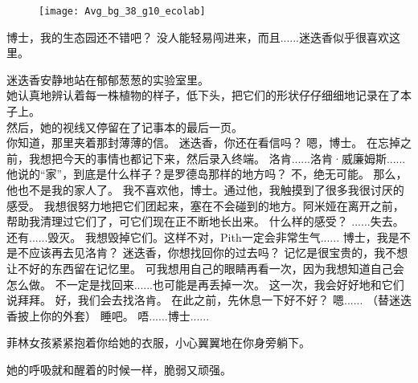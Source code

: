 \documentclass[openany]{book}
\begin{document}
\begin{figure}[h]
    \centering
    \texttt{[image: Avg\_bg\_38\_g10\_ecolab]}
\end{figure}
\begin{dialogue}
     博士，我的生态园还不错吧？
     没人能轻易闯进来，而且......迷迭香似乎很喜欢这里。\par
    迷迭香安静地站在郁郁葱葱的实验室里。\\
    她认真地辨认着每一株植物的样子，低下头，把它们的形状仔仔细细地记录在了本子上。\\
    然后，她的视线又停留在了记事本的最后一页。\\
    你知道，那里夹着那封薄薄的信。
     迷迭香，你还在看信吗？
     嗯，博士。
     在忘掉之前，我想把今天的事情也都记下来，然后录入终端。
     洛肯......洛肯·威廉姆斯......
     他说的“家”，到底是什么样子？是罗德岛那样的地方吗？
     不，绝无可能。
     那么，他也不是我的家人了。
     我不喜欢他，博士。通过他，我触摸到了很多我很讨厌的感受。
     我想很努力地把它们团起来，塞在不会碰到的地方。阿米娅在离开之前，帮助我清理过它们了，可它们现在正不断地长出来。
     什么样的感受？
     ......失去。
     还有......毁灭。
     我想毁掉它们。这样不对，Pith一定会非常生气......
     博士，我是不是不应该再去见洛肯？
     迷迭香，你想找回你的过去吗？
     记忆是很宝贵的，我不想让不好的东西留在记忆里。
     可我想用自己的眼睛再看一次，因为我想知道自己会怎么做。
     不一定是找回来......也可能是再丢掉一次。
     这一次，我会好好地和它们说拜拜。
     好，我们会去找洛肯。
     在此之前，先休息一下好不好？
     嗯......
     （替迷迭香披上你的外套）
     睡吧。
     唔......博士......
\end{dialogue}\par

菲林女孩紧紧抱着你给她的衣服，小心翼翼地在你身旁躺下。\par
她的呼吸就和醒着的时候一样，脆弱又顽强。\par
\end{document}
